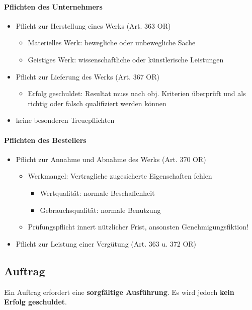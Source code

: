 \paragraph{Pflichten des Unternehmers}

\begin{itemize}
	\tightlist
	\item  Pflicht zur Herstellung eines Werks (Art. 363 OR)
	\begin{itemize}
		\tightlist
		\item  Materielles Werk: bewegliche oder unbewegliche Sache
		\item Geistiges Werk: wissenschaftliche oder künstlerische Leistungen
	\end{itemize}
	\item Pflicht zur Lieferung des Werks (Art. 367 OR)
	\begin{itemize}
		\tightlist
		\item Erfolg geschuldet:
		Resultat muss nach obj. Kriterien überprüft und als richtig oder falsch
		qualifiziert werden können
	\end{itemize}
	\item keine besonderen Treuepflichten
\end{itemize}

\paragraph{Pflichten des Bestellers}
\begin{itemize}
	\tightlist
	\item  Pflicht zur Annahme und Abnahme des Werks (Art. 370 OR)
	\begin{itemize}
		\tightlist
		\item  Werkmangel: Vertragliche zugesicherte Eigenschaften fehlen
		\begin{itemize}
			\tightlist
			\item Wertqualität: normale Beschaffenheit
			\item Gebrauchsqualität: normale Benutzung
		\end{itemize}
		\item Prüfungspflicht innert nützlicher	Frist, ansonsten
		Genehmigungsfiktion!
	\end{itemize}
	\item Pflicht zur Leistung einer Vergütung (Art. 363 u. 372 OR)
\end{itemize}

\subsection{Auftrag}
\label{sec:Auftrag-Overview}
Ein Auftrag erfordert eine \textbf{sorgfältige Ausführung}. Es wird jedoch
\textbf{kein Erfolg geschuldet}.

